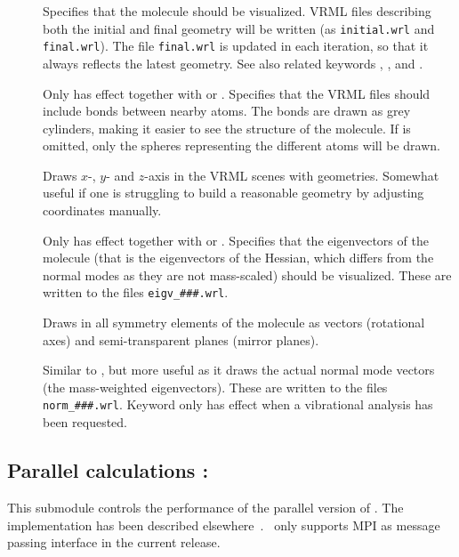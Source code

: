 \begin{description}
\item[]
Specifies that the molecule should be
visualized. VRML files describing
both the initial and final geometry
will be written (as \verb|initial.wrl| and \verb|final.wrl|). The file
\verb|final.wrl| is  updated in each iteration, so that it always
reflects the latest geometry. See also related keywords ,
,  and .

\item[]
Only has effect together with  or . Specifies
that the VRML files should include bonds between nearby
atoms. The
bonds are drawn as grey cylinders, making it easier to see the
structure of the molecule. If  is omitted, only the
spheres representing the different atoms will be drawn.

\item[]
Draws $x$-, $y$- and $z$-axis in the VRML scenes with
geometries. Somewhat useful if one is struggling to build a reasonable
geometry by adjusting coordinates manually.

\item[]
Only has effect together with  or
.
Specifies that the eigenvectors of the molecule (that is the
eigenvectors of the Hessian, which differs from the normal modes as
they are not mass-scaled) should be visualized. These are written to
the files \verb|eigv_###.wrl|.

\item[]
Draws in all symmetry elements of the molecule as vectors (rotational
axes) and semi-transparent planes (mirror planes).

\item[]
Similar to , but more useful as it draws the actual normal
mode vectors (the mass-weighted eigenvectors). These are written to
the files \verb|norm_###.wrl|. Keyword only has effect when a
vibrational analysis has been requested.

\end{description}


\subsection{Parallel calculations : }

This submodule controls the performance of the parallel
version
of \dalton . The implementation has been described
elsewhere~\cite{pndjhapdkrthhkcpl253}. \dalton\ only supports MPI as
message passing interface in the current release.

